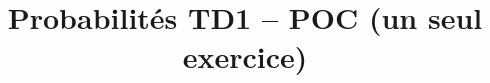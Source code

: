 

\usepackage{estp-ia}

\renewcommand{\ExoRoot}{../exercices}

\renewcommand{\ExoIABaseURL}{https://td.estp.fr/exo/}

\title{Probabilités TD1 -- POC (un seul exercice)}
\author{}
\date{}


\sffamily
\maketitle



